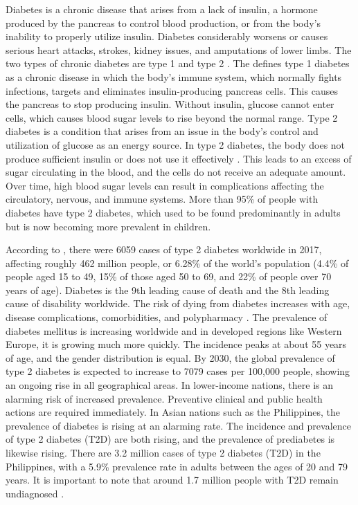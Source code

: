 
Diabetes is a chronic disease that arises from a lack of insulin, a hormone
produced by the pancreas to control blood production, or from the body's
inability to properly utilize insulin. Diabetes considerably worsens or causes
serious heart attacks, strokes, kidney issues, and amputations of lower limbs.
The two types of chronic diabetes are type 1 and type 2
\parencite{who-2023-diabetes}. The \textcite{niddk-2023} defines type 1 diabetes
as a chronic disease in which the body's immune system, which normally fights
infections, targets and eliminates insulin-producing pancreas cells. This causes
the pancreas to stop producing insulin. Without insulin, glucose cannot enter
cells, which causes blood sugar levels to rise beyond the normal range. Type 2
diabetes is a condition that arises from an issue in the body's control and
utilization of glucose as an energy source. In type 2 diabetes, the body does
not produce sufficient insulin or does not use it effectively
\parencite{chundawat-2022}. This leads to an excess of sugar circulating in the
blood, and the cells do not receive an adequate amount. Over time, high blood
sugar levels can result in complications affecting the circulatory, nervous, and
immune systems. More than 95\% of people with diabetes have type 2 diabetes,
which used to be found predominantly in adults but is now becoming more
prevalent in children.

According to \textcite{khan-2019}, there were 6059 cases of type 2 diabetes
worldwide in 2017, affecting roughly 462 million people, or 6.28\% of the world's
population (4.4\% of people aged 15 to 49, 15\% of those aged 50 to 69, and 22\% of
people over 70 years of age). Diabetes is the 9th leading cause of death and the
8th leading cause of disability worldwide. The risk of dying from diabetes
increases with age, disease complications, comorbidities, and polypharmacy \parencite{who-2023-mortality}. The prevalence of
diabetes mellitus is increasing worldwide and in developed regions like Western
Europe, it is growing much more quickly. The incidence peaks at about 55 years
of age, and the gender distribution is equal. By 2030, the global prevalence of
type 2 diabetes is expected to increase to 7079 cases per 100,000 people,
showing an ongoing rise in all geographical areas. In lower-income nations,
there is an alarming risk of increased prevalence. Preventive clinical and
public health actions are required immediately. In Asian nations such as the
Philippines, the prevalence of diabetes is rising at an alarming rate. The
incidence and prevalence of type 2 diabetes (T2D) are both rising, and the
prevalence of prediabetes is likewise rising. There are 3.2 million cases of
type 2 diabetes (T2D) in the Philippines, with a 5.9\% prevalence rate in adults
between the ages of 20 and 79 years. It is important to note that around 1.7
million people with T2D remain undiagnosed \parencite{tan-2016}.

